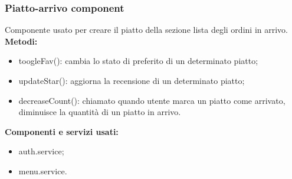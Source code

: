 \subsubsection{Piatto-arrivo component}
Componente usato per creare il piatto della sezione lista degli ordini in arrivo.\\
\textbf{Metodi:}
\begin{itemize}
    \item toogleFav(): cambia lo stato di preferito di un determinato piatto;
    \item updateStar(): aggiorna la recensione di un determinato piatto;
    \item decreaseCount(): chiamato quando utente marca un piatto come arrivato, diminuisce la quantità di un piatto in arrivo.
\end{itemize}
\textbf{Componenti e servizi usati:}
\begin{itemize}
    \item auth.service;
    \item menu.service.
\end{itemize}


